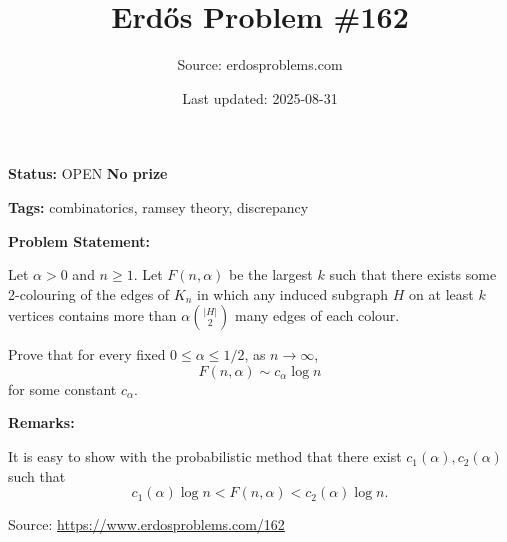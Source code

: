 \documentclass{article}
\title{Erd\H{o}s Problem \#162}
\date{Last updated: 2025-08-31}
\author{Source: erdosproblems.com}
\begin{document}
\maketitle

\noindent\textbf{Status:} OPEN \quad \textbf{No prize}

\noindent\textbf{Tags:} combinatorics, ramsey theory, discrepancy

\medskip
\noindent\textbf{Problem Statement:}

Let $\alpha>0$ and $n\geq 1$. Let $F(n,\alpha)$ be the largest $k$ such that there exists some 2-colouring of the edges of $K_n$ in which any induced subgraph $H$ on at least $k$ vertices contains more than $\alpha\binom{\lvert H\rvert}{2}$ many edges of each colour.

Prove that for every fixed $0\leq \alpha \leq 1/2$, as $n\to\infty$,\[F(n,\alpha)\sim c_\alpha \log n\]for some constant $c_\alpha$.

\bigskip
\noindent\textbf{Remarks:}

It is easy to show with the probabilistic method that there exist $c_1(\alpha),c_2(\alpha)$ such that\[c_1(\alpha)\log n < F(n,\alpha) < c_2(\alpha)\log n.\]

\bigskip
\noindent\small{Source: \url{https://www.erdosproblems.com/162}}
\end{document}

